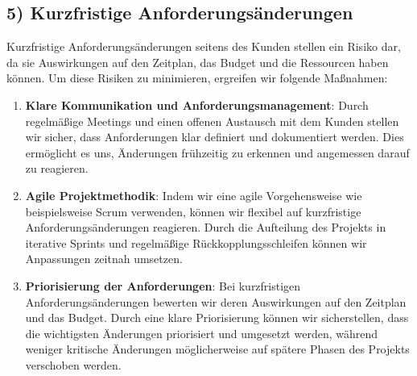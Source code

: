 \subsection*{5) Kurzfristige Anforderungsänderungen}
Kurzfristige Anforderungsänderungen seitens des Kunden stellen ein Risiko dar, da sie Auswirkungen auf den Zeitplan, das Budget und die Ressourcen haben können.
Um diese Risiken zu minimieren, ergreifen wir folgende Maßnahmen:
\begin{enumerate}
    \item \textbf{Klare Kommunikation und Anforderungsmanagement}: Durch regelmäßige Meetings und einen offenen Austausch mit dem Kunden stellen wir sicher, dass Anforderungen klar definiert und dokumentiert werden. Dies ermöglicht es uns, Änderungen frühzeitig zu erkennen und angemessen darauf zu reagieren.
    \item \textbf{Agile Projektmethodik}: Indem wir eine agile Vorgehensweise wie beispielsweise Scrum verwenden, können wir flexibel auf kurzfristige Anforderungsänderungen reagieren. Durch die Aufteilung des Projekts in iterative Sprints und regelmäßige Rückkopplungsschleifen können wir Anpassungen zeitnah umsetzen.
    \item \textbf{Priorisierung der Anforderungen}: Bei kurzfristigen Anforderungsänderungen bewerten wir deren Auswirkungen auf den Zeitplan und das Budget. Durch eine klare Priorisierung können wir sicherstellen, dass die wichtigsten Änderungen priorisiert und umgesetzt werden, während weniger kritische Änderungen möglicherweise auf spätere Phasen des Projekts verschoben werden.
\end{enumerate}